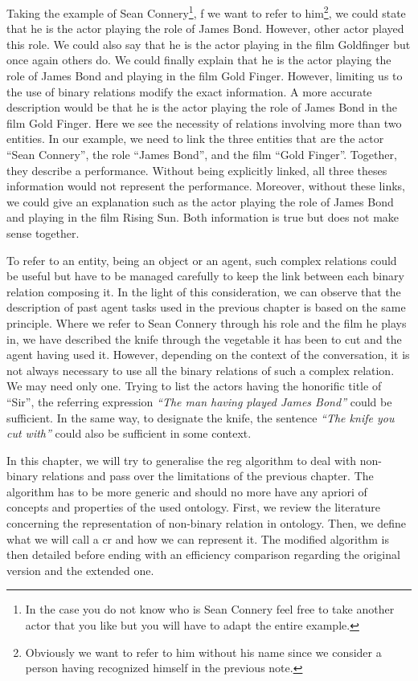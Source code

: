 Taking the example of Sean Connery\footnote{In the case you do not know who is Sean Connery feel free to take another actor that you like but you will have to adapt the entire example.}, f we want to refer to him\footnote{Obviously we want to refer to him without his name since we consider a person having recognized himself in the previous note.}, we could state that he is the actor playing the role of James Bond. However, other actor played this role. We could also say that he is the actor playing in the film Goldfinger but once again others do. We could finally explain that he is the actor playing the role of James Bond and playing in the film Gold Finger. However, limiting us to the use of binary relations modify the exact information. A more accurate description would be that he is the actor playing the role of James Bond in the film Gold Finger. Here we see the necessity of relations involving more than two entities. In our example, we need to link the three entities that are the actor ``Sean Connery'', the role ``James Bond'', and the film ``Gold Finger''. Together, they describe a performance. Without being explicitly linked, all three theses information would not represent the performance. Moreover, without these links, we could give an explanation such as the actor playing the role of James Bond and playing in the film Rising Sun. Both information is true but does not make sense together.

To refer to an entity, being an object or an agent, such complex relations could be useful but have to be managed carefully to keep the link between each binary relation composing it. In the light of this consideration, we can observe that the description of past agent tasks used in the previous chapter is based on the same principle. Where we refer to Sean Connery through his role and the film he plays in, we have described the knife through the vegetable it has been to cut and the agent having used it. However, depending on the context of the conversation, it is not always necessary to use all the binary relations of such a complex relation. We may need only one. Trying to list the actors having the honorific title of ``Sir'', the referring expression \textit{``The man having played James Bond''} could be sufficient. In the same way, to designate the knife, the sentence \textit{``The knife you cut with''} could also be sufficient in some context.

In this chapter, we will try to generalise the \acrshort{reg} algorithm to deal with non-binary relations and pass over the limitations of the previous chapter. The algorithm has to be more generic and should no more have any apriori of concepts and properties of the used ontology.
First, we review the literature concerning the representation of non-binary relation in ontology. Then, we define what we will call a \acrlong{cr} and how we can represent it. The modified algorithm is then detailed before ending with an efficiency comparison regarding the original version and the extended one.

